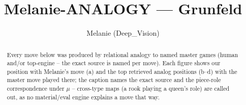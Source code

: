 \documentclass[11pt]{article}
\title{Melanie-ANALOGY — Grunfeld}
\author{Melanie (Deep\_Vision)}
\date{}
\begin{document}
\maketitle

\begin{abstract}Every move below was produced by relational analogy to named master games (human and/or top-engine -- the exact source is named per move). Each figure shows our position with Melanie's move (a) and the top retrieved analog positions (b--d) with the master move played there; the caption names the exact source and the piece-role correspondence under $\mu$ -- cross-type maps (a rook playing a queen's role) are called out, as no material/eval engine explains a move that way.\end{abstract}

\begin{figure}[p]\centering
\begin{subfigure}{0.46\textwidth}\centering
\resizebox{\linewidth}{!}{%
\newchessgame
\chessboard[
  setfen={rnbqk2r/ppp1ppbp/6p1/8/3PP2P/2P5/P4PP1/R1BQKBNR b KQkq - 0 7},
  showmover=false,
  pgfstyle=straightmove, color=movearrow, markmove={f7-f6}
]}
\caption{}
\end{subfigure}\hfill
\begin{subfigure}{0.46\textwidth}\centering
\resizebox{\linewidth}{!}{%
\newchessgame
\chessboard[
  setfen={rnbqkb1r/ppp1pp1p/6p1/8/3PP3/2P5/P4PPP/R1BQKBNR b KQkq - 0 6},
  showmover=false,
  pgfstyle=straightmove, color=movearrow, markmove={f8-g7}
]}
\caption{}
\end{subfigure}
\\[4pt]
\begin{subfigure}{0.46\textwidth}\centering
\resizebox{\linewidth}{!}{%
\newchessgame
\chessboard[
  setfen={rnbqkb1r/ppp1pp1p/6p1/8/3PP3/2P5/P4PPP/R1BQKBNR b KQkq - 0 6},
  showmover=false,
  pgfstyle=straightmove, color=movearrow, markmove={f8-g7}
]}
\caption{}
\end{subfigure}\hfill
\begin{subfigure}{0.46\textwidth}\centering
\resizebox{\linewidth}{!}{%
\newchessgame
\chessboard[
  setfen={rnbqkb1r/ppp1pp1p/6p1/8/3PP3/2P5/P4PPP/R1BQKBNR b KQkq - 0 6},
  showmover=false,
  pgfstyle=straightmove, color=movearrow, markmove={f8-g7}
]}
\caption{}
\end{subfigure}

\end{figure}
\end{document}
